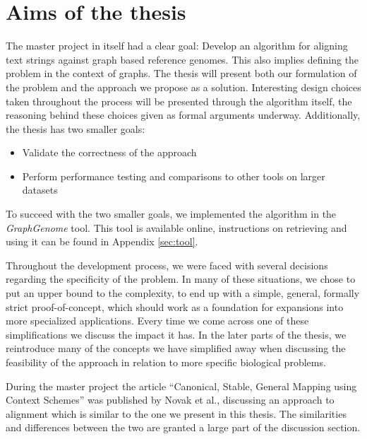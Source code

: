 \documentclass[thesis.tex]{subfiles}
\begin{document}
\section{Aims of the thesis}
The master project in itself had a clear goal: Develop an algorithm for aligning text strings against graph based reference genomes. This also implies defining the problem in the context of graphs. The thesis will present both our formulation of the problem and the approach we propose as a solution. Interesting design choices taken throughout the process will be presented through the algorithm itself, the reasoning behind these choices given as formal arguments underway. Additionally, the thesis has two smaller goals:
\begin{itemize}
  \item Validate the correctness of the approach
  \item Perform performance testing and comparisons to other tools on larger datasets
\end{itemize}
To succeed with the two smaller goals, we implemented the algorithm in the \textit{GraphGenome} tool. This tool is available online, instructions on retrieving and using it can be found in Appendix \ref{sec:tool}.\\
\par\noindent
Throughout the development process, we were faced with several decisions regarding the specificity of the problem. In many of these situations, we chose to put an upper bound to the complexity, to end up with a simple, general, formally strict proof-of-concept, which should work as a foundation for  expansions into more specialized applications.  Every time we come across one of these simplifications we discuss the impact it has. In the later parts of the thesis, we reintroduce many of the concepts we have simplified away when discussing the feasibility of the approach in relation to more specific biological problems.\\
\par\noindent
During the master project the article ``Canonical, Stable, General Mapping using Context Schemes'' \cite{canonical_stable_general_mapping_using_context_schemes} was published by Novak et al., discussing an approach to alignment which is similar to the one we present in this thesis. The similarities and differences between the two are granted a large part of the discussion section.
\end{document}
